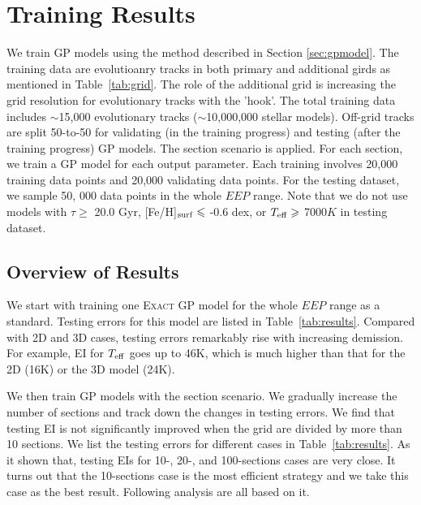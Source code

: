\section{Training Results}\label{sec:results}

We train GP models using the method described in Section \ref{sec:gpmodel}. The training data are evolutioanry tracks in both primary and additional girds as mentioned in Table~\ref{tab:grid}. The role of the additional grid is increasing the grid resolution for evolutionary tracks with the 'hook'. 
The total training data includes $\sim$15,000 evolutionary tracks ($\sim$10,000,000 stellar models). Off-grid tracks are split 50-to-50 for validating (in the training progress) and testing (after the training progress) GP models.
The section scenario is applied. For each section, we train a GP model for each output parameter. Each training involves 20,000 training data points and 20,000 validating data points. For the testing dataset, we sample 50, 000 data points in the whole $EEP$ range. Note that we do not use models with $\tau \geq$ 20.0 Gyr, [Fe/H]$_{\rm surf} \leq$ -0.6 dex, or $T_{\rm eff} \geq$ 7000$K$ in testing dataset. 

\subsection{Overview of Results}

We start with training one \textsc{Exact GP} model for the whole $EEP$ range as a standard. Testing errors for this model are listed in Table~\ref{tab:results}. Compared with 2D and 3D cases, testing errors remarkably rise with increasing demission. For example, EI for $T_{\rm eff}$ goes up to 46K, which is much higher than that for the 2D (16K) or the 3D model (24K). 

We then train GP models with the section scenario. We gradually increase the number of sections and track down the changes in testing errors. 
We find that testing EI is not significantly improved when the grid are divided by more than 10 sections. We list the testing errors for different cases in Table~\ref{tab:results}. As it shown that, testing EIs for 10-, 20-, and 100-sections cases are very close. It turns out that the 10-sections case is the most efficient strategy and we take this case as the best result. Following analysis are all based on it. 

